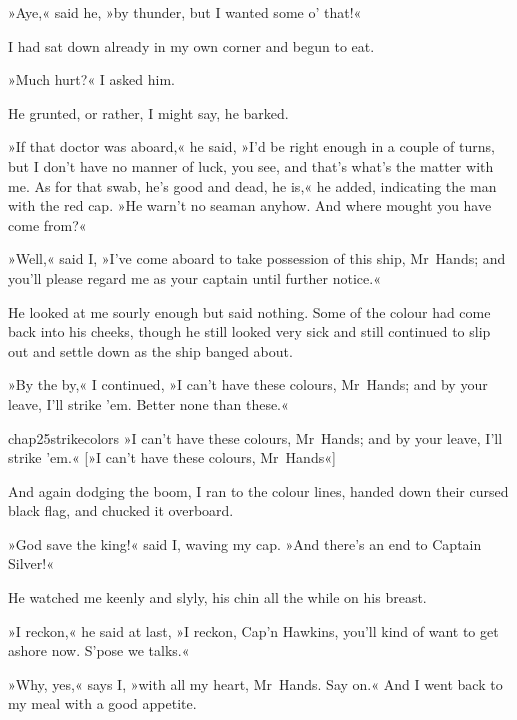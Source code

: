 »Aye,« said he, »by thunder, but I wanted some o' that!«

I had sat down already in my own corner and begun to eat.

»Much hurt?« I asked him.

He grunted, or rather, I might say, he barked.

»If that doctor was aboard,« he said, »I'd be right enough in a couple of turns, but I don't have no manner of luck, you see, and that's what's the matter with me. As for that swab, he's good and dead, he is,« he added, indicating the man with the red cap. »He warn't no seaman anyhow. And where mought you have come from?«

»Well,« said I, »I've come aboard to take possession of this ship, Mr~Hands; and you'll please regard me as your captain until further notice.«

He looked at me sourly enough but said nothing. Some of the colour had come back into his cheeks, though he still looked very sick and still continued to slip out and settle down as the ship banged about.

»By the by,« I continued, »I can't have these colours, Mr~Hands; and by your leave, I'll strike 'em. Better none than these.«


\begin{bwbigpic}
	[\picsize]
	{chap25strikecolors}
	{»I can't have these colours, Mr~Hands; and by your leave, I'll strike 'em.«}
	[»I can't have these colours, Mr~Hands«]
\end{bwbigpic}

And again dodging the boom, I ran to the colour lines, handed down their cursed black flag, and chucked it overboard.

»God save the king!« said I, waving my cap. »And there's an end to Captain Silver!«

He watched me keenly and slyly, his chin all the while on his breast.

»I reckon,« he said at last, »I reckon, Cap'n Hawkins, you'll kind of want to get ashore now. S'pose we talks.«

»Why, yes,« says I, »with all my heart, Mr~Hands. Say on.« And I went back to my meal with a good appetite.

